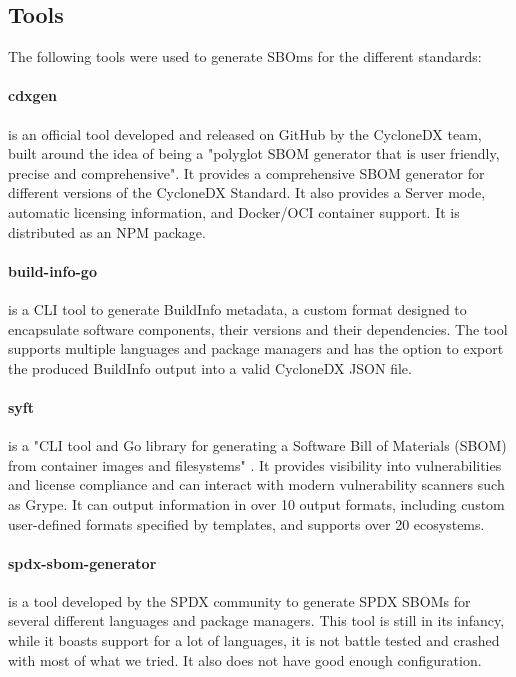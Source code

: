 \subsection{Tools} \label{dataset:tools}

The following tools were used to generate SBOms for the different standards:

\paragraph{cdxgen} is an official tool developed and released on GitHub by the CycloneDX team, built around the idea of being a "polyglot SBOM generator that is user friendly, precise and comprehensive". It provides a comprehensive SBOM generator for different versions of the CycloneDX Standard. It also provides a Server mode, automatic licensing information, and Docker/OCI container support. It is distributed as an NPM package.

\paragraph{build-info-go} is a CLI tool to generate BuildInfo metadata, a custom format designed to encapsulate software components, their versions and their dependencies. The tool supports multiple languages and package managers and has the option to export the produced BuildInfo output into a valid CycloneDX JSON file.

\paragraph{syft} is a "CLI tool and Go library for generating a Software Bill of Materials (SBOM) from container images and filesystems" \cite{repository:cyclonedx:syft}. It provides visibility into vulnerabilities and license compliance and can interact with modern vulnerability scanners such as Grype. It can output information in over 10 output formats, including custom user-defined formats specified by templates, and supports over 20 ecosystems.

\paragraph{spdx-sbom-generator} is a tool developed by the SPDX community to generate SPDX SBOMs for several different languages and package managers. This tool is still in its infancy, while it boasts support for a lot of languages, it is not battle tested and crashed with most of what we tried. It also does not have good enough configuration.

